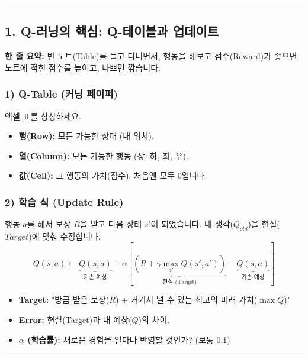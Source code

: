\documentclass[11pt,a4paper]{book}
\theoremstyle{definition}
\begin{document}
\vspace{0.5cm}\hrule\vspace{0.5cm}

\subsection{1. Q-러닝의 핵심: Q-테이블과 업데이트}

\begin{conceptbox}[title={개념 1: 나만의 맛집 리스트 작성}]
\textbf{한 줄 요약:} 빈 노트(Table)를 들고 다니면서, 행동을 해보고 점수(Reward)가 좋으면 노트에 적힌 점수를 높이고, 나쁘면 깎습니다.
\end{conceptbox}

\subsubsection*{1) Q-Table (커닝 페이퍼)}
엑셀 표를 상상하세요.
\begin{itemize}
    \item \textbf{행(Row):} 모든 가능한 상태 (내 위치).
    \item \textbf{열(Column):} 모든 가능한 행동 (상, 하, 좌, 우).
    \item \textbf{값(Cell):} 그 행동의 가치(점수). 처음엔 모두 0입니다.
\end{itemize}

\subsubsection*{2) 학습 식 (Update Rule)}
행동 $a$를 해서 보상 $R$을 받고 다음 상태 $s'$이 되었습니다. 내 생각($Q_{old}$)을 현실($Target$)에 맞춰 수정합니다.
$$ Q(s, a) \leftarrow \underbrace{Q(s, a)}_{\text{기존 예상}} + \alpha \left[ \underbrace{(R + \gamma \max_{a'} Q(s', a'))}_{\text{현실 (Target)}} - \underbrace{Q(s, a)}_{\text{기존 예상}} \right] $$
\begin{itemize}
    \item \textbf{Target:} "방금 받은 보상($R$) + 거기서 낼 수 있는 최고의 미래 가치($\max Q$)"
    \item \textbf{Error:} 현실(Target)과 내 예상($Q$)의 차이.
    \item \textbf{$\alpha$ (학습률):} 새로운 경험을 얼마나 반영할 것인가? (보통 0.1)
\end{itemize}

\vspace{0.5cm}\hrule\vspace{0.5cm}
\end{document}
